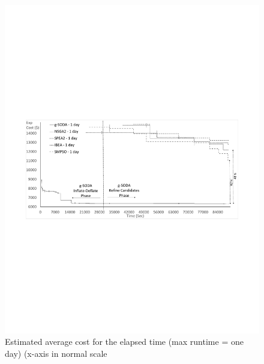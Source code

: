 \documentclass[a4paper, 12pt]{article} %
\begin{document}
\begin{figure}[t]
	\begin{minipage}{.5\textwidth}
	\begin{center}
	\includegraphics[width=\textwidth]{images/sodavsjmetal1day.pdf}
	\caption{Estimated average cost for the elapsed time (max runtime = one day) (x-axis in normal scale}
	\label{fig:GraphsForTime_24hours}       %
\end{center}
\end{minipage}
\hfill
\begin{minipage}{.5\textwidth}
	\begin{center}

\end{center}
\end{minipage}
\end{figure}
\end{document}
